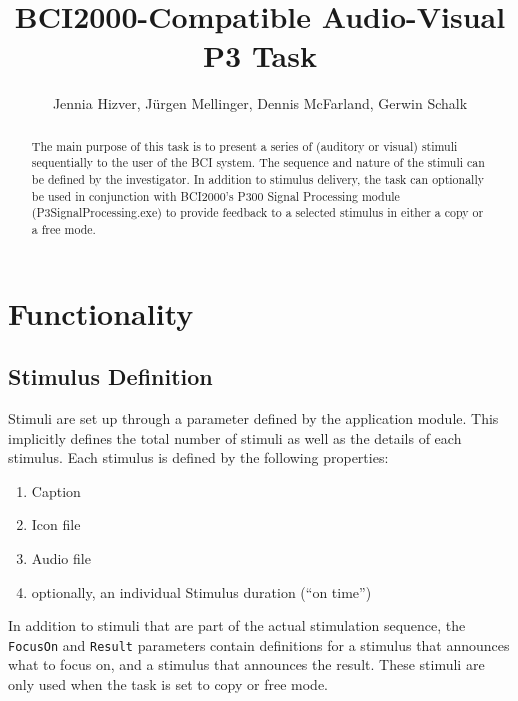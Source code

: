 \documentclass[letterpaper,oneside,12pt]{article}
\begin{document}
%
\title{BCI2000-Compatible Audio-Visual P3 Task}
\author{Jennia Hizver, J\"{u}rgen Mellinger, Dennis McFarland, Gerwin Schalk}
\maketitle

\tableofcontents

\newpage 

\begin{abstract}

The main purpose of this task is to present a series of (auditory or visual) 
stimuli sequentially to the user of the BCI system. The sequence and nature of 
the stimuli can be defined by the investigator. In addition to stimulus 
delivery, the task can optionally be used in conjunction with BCI2000's P300 
Signal Processing module (P3SignalProcessing.exe) to provide feedback to a 
selected stimulus in either a copy or a free mode.

\end{abstract}

\section{Functionality}

\subsection{Stimulus Definition}
\label{sec:stimulusdefinition}

Stimuli are set up through a parameter defined by the application module. This
implicitly defines the total number of stimuli as well as the details of each stimulus.
Each stimulus is defined by the following properties:
\begin{enumerate}
 \item Caption
 \item Icon file
 \item Audio file
 \item optionally, an individual Stimulus duration (``on time'')
\end{enumerate}

In addition to stimuli that are part of the actual stimulation sequence, the {\tt FocusOn} 
and {\tt Result} parameters contain definitions for a stimulus that announces what to focus on,
and a stimulus that announces the result. These
stimuli are only used when the task is set to copy or free mode.
\end{document}
